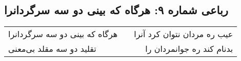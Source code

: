 \begin{center}
\section*{رباعی شماره ۹: هرگاه که بینی دو سه سرگردانرا}
\label{sec:sh009}
\begin{longtable}{l p{0.5cm} r}
هرگاه که بینی دو سه سرگردانرا
&&
عیب ره مردان نتوان کرد آنرا
\\
تقلید دو سه مقلد بی‌معنی
&&
بدنام کند ره جوانمردان را
\\
\end{longtable}
\end{center}
